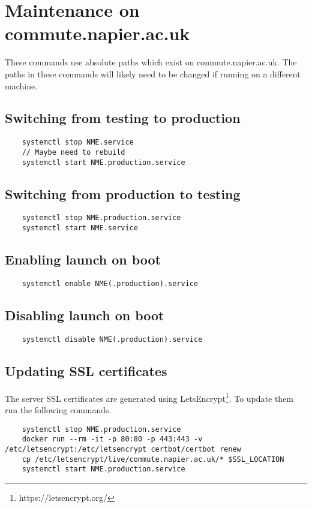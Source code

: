 \section{Maintenance on commute.napier.ac.uk}

These commands use absolute paths which exist on commute.napier.ac.uk. The paths in these commands will likely need to be changed if running on a different machine.

\subsection{Switching from testing to production}

\begin{verbatim}
	systemctl stop NME.service
	// Maybe need to rebuild
	systemctl start NME.production.service
\end{verbatim}

\subsection{Switching from production to testing}

\begin{verbatim}
	systemctl stop NME.production.service
	systemctl start NME.service
\end{verbatim}

\subsection{Enabling launch on boot}

\begin{verbatim}
	systemctl enable NME(.production).service
\end{verbatim}

\subsection{Disabling launch on boot}

\begin{verbatim}
	systemctl disable NME(.production).service
\end{verbatim}

\subsection{Updating SSL certificates}

The server SSL certificates are generated using LetsEncrypt\footnote{https://letsencrypt.org/}. To update them run the following commands.

\begin{verbatim}
	systemctl stop NME.production.service
	docker run --rm -it -p 80:80 -p 443:443 -v /etc/letsencrypt:/etc/letsencrypt certbot/certbot renew
	cp /etc/letsencrypt/live/commute.napier.ac.uk/* $SSL_LOCATION
	systemctl start NME.production.service
\end{verbatim}
